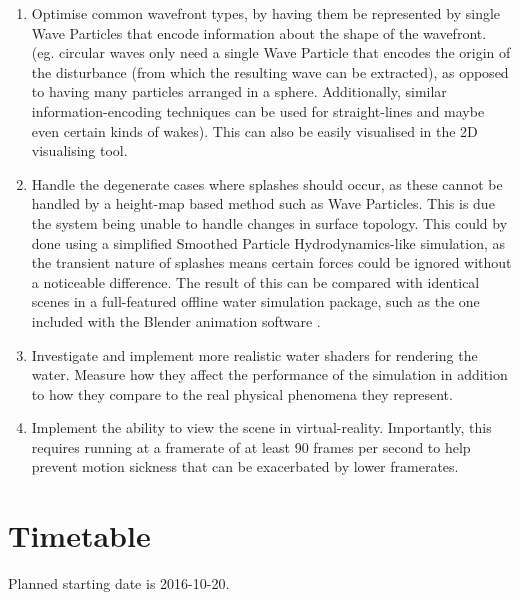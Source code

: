 \begin{enumerate}

\item Optimise common wavefront types, by having them be represented by single
Wave Particles that encode information about the shape of the wavefront. (eg.
circular waves only need a single Wave Particle that encodes the origin of the
disturbance (from which the resulting wave can be extracted), as opposed to
having many particles arranged in a sphere. Additionally, similar
information-encoding techniques can be used for straight-lines and maybe even
certain kinds of wakes). This can also be easily visualised in the 2D
visualising tool.

\item Handle the degenerate cases where splashes should occur, as these cannot
be handled by a height-map based method such as Wave Particles. This is due the
system being unable to handle changes in surface topology. This could by done
using a simplified Smoothed Particle Hydrodynamics-like simulation, as the
transient nature of splashes means certain forces could be ignored without a
noticeable difference. The result of this can be compared with identical scenes
in a full-featured offline water simulation package, such as the one included
with the Blender animation software \cite{blenderfluid}.

\item Investigate and implement more realistic water shaders for rendering the
water. Measure how they affect the performance of the simulation in addition to
how they compare to the real physical phenomena they represent.

\item Implement the ability to view the scene in virtual-reality. Importantly,
this requires running at a framerate of at least 90 frames per second to help
prevent motion sickness that can be exacerbated by lower framerates.

\end{enumerate}

\section*{Timetable}

Planned starting date is 2016-10-20.

